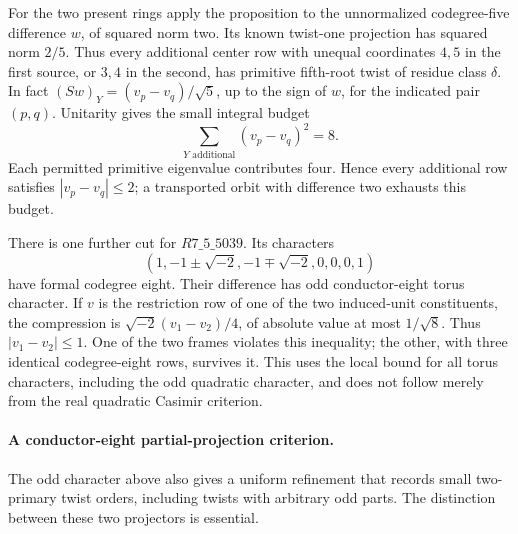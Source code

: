 For the two present rings apply the proposition to the unnormalized
codegree-five difference $w$, of squared norm two.  Its known
twist-one projection has squared norm $2/5$.  Thus every additional
center row with unequal coordinates $4,5$ in the first source, or
$3,4$ in the second, has primitive fifth-root twist of residue class
$\delta$.  In fact $(Sw)_Y=(v_p-v_q)/\sqrt5$, up to the sign of
$w$, for the indicated pair $(p,q)$.  Unitarity gives the small
integral budget
\[
 \sum_{Y\text{ additional}}(v_p-v_q)^2=8.
\]
Each permitted primitive eigenvalue contributes four.  Hence every
additional row satisfies $|v_p-v_q|\leq2$; a transported orbit with
difference two exhausts this budget.

There is one further cut for $R7\_5\_5039$.  Its characters
\[
 (1,-1\pm\sqrt{-2},-1\mp\sqrt{-2},0,0,0,1)
\]
have formal codegree eight.  Their difference has odd conductor-eight
torus character.  If $v$ is the restriction row of one of the two
induced-unit constituents, the compression is
$\sqrt{-2}(v_1-v_2)/4$, of absolute value at most $1/\sqrt8$.
Thus $|v_1-v_2|\leq1$.  One of the two frames violates this inequality;
the other, with three identical codegree-eight rows, survives it.
This uses the local bound for all torus characters, including the odd
quadratic character, and does not follow merely from the real quadratic
Casimir criterion.

\paragraph{A conductor-eight partial-projection criterion.}
The odd character above also gives a uniform refinement that records
small two-primary twist orders, including twists with arbitrary odd
parts.  The distinction between these two projectors is essential.

